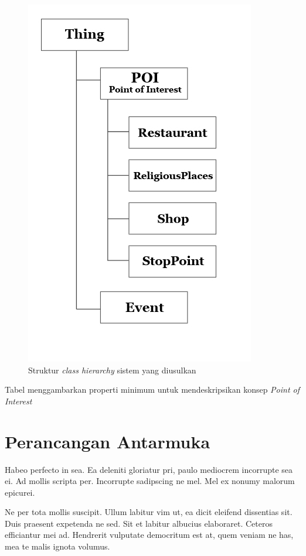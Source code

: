 	\begin{figure}[H]
		\centering
		\includegraphics[scale=0.45]{gambar/classhierarchy.png}
		\caption{Struktur \emph{class hierarchy} sistem yang diusulkan}
		\label{fig:classhierarchy}
	\end{figure}
	
	Tabel menggambarkan properti minimum untuk mendeskripsikan konsep \emph{Point of Interest}
	
	

	\section{Perancangan Antarmuka}
		Habeo perfecto in sea. Ea deleniti gloriatur pri, paulo mediocrem incorrupte sea ei. Ad mollis scripta per. Incorrupte sadipscing ne mel. Mel ex nonumy malorum epicurei.

		Ne per tota mollis suscipit. Ullum labitur vim ut, ea dicit eleifend dissentias sit. Duis praesent expetenda ne sed. Sit et labitur albucius elaboraret. Ceteros efficiantur mei ad. Hendrerit vulputate democritum est at, quem veniam ne has, mea te malis ignota volumus.

